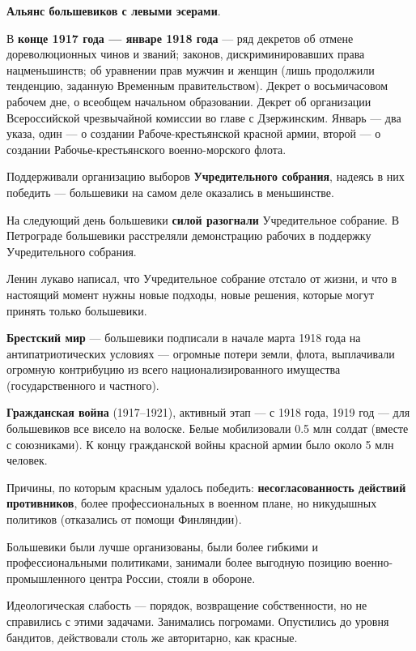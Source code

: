 \documentclass{article}
\begin{document}
\textbf{Альянс большевиков с левыми эсерами}.

В \textbf{конце 1917 года — январе 1918 года} — ряд декретов об отмене дореволюционных чинов и званий; законов, дискриминировавших права нацменьшинств; об уравнении прав мужчин и женщин (лишь продолжили тенденцию, заданную Временным правительством). Декрет о восьмичасовом рабочем дне, о всеобщем начальном образовании. Декрет об организации Всероссийской чрезвычайной комиссии во главе с Дзержинским. Январь — два указа, один — о создании Рабоче-крестьянской красной армии, второй — о создании Рабочье-крестьянского военно-морского флота.

Поддерживали организацию выборов \textbf{Учредительного собрания}, надеясь в них победить — большевики на самом деле оказались в меньшинстве.

На следующий день большевики \textbf{силой разогнали} Учредительное собрание. В Петрограде большевики расстреляли демонстрацию рабочих в поддержку Учредительного собрания.

Ленин лукаво написал, что Учредительное собрание отстало от жизни, и что в настоящий момент нужны новые подходы, новые решения, которые могут принять только большевики.

\hfill

\textbf{Брестский мир} — большевики подписали в начале марта 1918 года на антипатриотических условиях — огромные потери земли, флота, выплачивали огромную контрибуцию из всего национализированного имущества (государственного и частного).

\hfill

\textbf{Гражданская война} (1917–1921), активный этап — с 1918 года, 1919 год — для большевиков все висело на волоске. Белые мобилизовали 0.5 млн солдат (вместе с союзниками). К концу гражданской войны красной армии было около 5 млн человек. 

Причины, по которым красным удалось победить: \textbf{несогласованность действий противников}, более профессиональных в военном плане, но никудышных политиков (отказались от помощи Финляндии).

Большевики были лучше организованы, были более гибкими и профессиональными политиками, занимали более выгодную позицию военно-промышленного центра России, стояли в обороне.

Идеологическая слабость — порядок, возвращение собственности, но не справились с этими задачами. Занимались погромами. Опустились до уровня бандитов, действовали столь же авторитарно, как красные.
\end{document}
